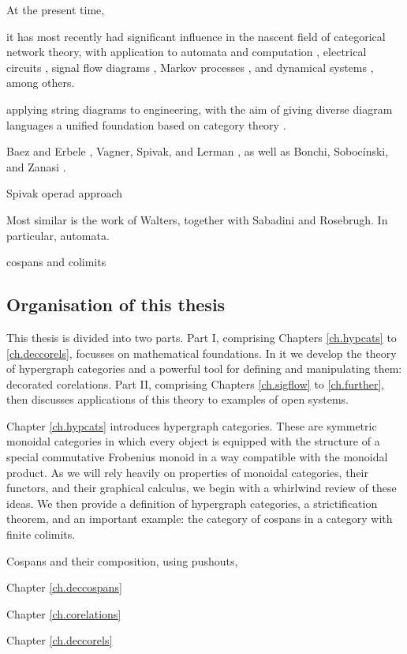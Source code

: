 At the present time, 

it has most recently had
significant influence in the nascent field of categorical network theory, with
application to automata and computation \cite{KSW2, Sp}, electrical circuits
\cite{BF}, signal flow diagrams \cite{BSZ, BE}, Markov processes \cite{BFP,
ASW}, and dynamical systems \cite{VSL}, among others. 

applying string diagrams to engineering, with the aim of
giving diverse diagram languages a unified foundation based on category theory
\cite{KSW,RSW05}. 

Baez and Erbele
\cite{BE}, Vagner, Spivak, and Lerman \cite{VSL}, as well as Bonchi,
Soboc\'inski, and Zanasi \cite{BSZ,BSZ2,BSZ3,Za}. 


Spivak operad approach

Most similar is the work of Walters, together with Sabadini and Rosebrugh. In
particular, automata.

cospans and colimits



\subsection*{Organisation of this thesis}
This thesis is divided into two parts. Part I, comprising Chapters
\ref{ch.hypcats} to \ref{ch.deccorels}, focusses on mathematical foundations. In
it we develop the theory of hypergraph categories and a powerful tool for
defining and manipulating them: decorated corelations. Part II, comprising
Chapters \ref{ch.sigflow} to \ref{ch.further}, then discusses applications of
this theory to examples of open systems.

Chapter \ref{ch.hypcats} introduces hypergraph categories. These are symmetric
monoidal categories in which every object is equipped with the structure of a
special commutative Frobenius monoid in a way compatible with the monoidal
product. As we will rely heavily on properties of monoidal categories, their
functors, and their graphical calculus, we begin with a whirlwind review of
these ideas. We then provide a definition of hypergraph categories, a
strictification theorem, and an important example: the category of cospans in a
category with finite colimits.

Cospans and their composition, using pushouts, 

Chapter \ref{ch.deccospans}

Chapter \ref{ch.corelations}

Chapter \ref{ch.deccorels}

